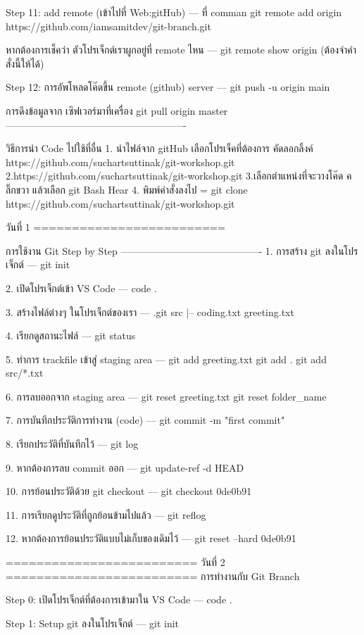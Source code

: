 {{Step 11: add remote (เข้าไปที่  Web:gitHub)
---
ที่ comman 
git remote add origin https://github.com/iamsamitdev/git-branch.git

หากต้องการเช็คว่า ตัวโปรเจ็กต์เราผูกอยู่ที่ remote ไหน
---
git remote show origin (ต้องจำคำสั่งนี้ให้ได้)

Step 12: การอัพโหลดโค๊ดขึ้น remote (github) server
---
git push -u origin main

การดึงข้อมูลจาก เซิฟเวอร์มาที่เครื่อง
git pull origin master
-------------------------------------------------------

วิธีการนำ Code ไปใช้ที่อื่น
1. นำไฟล์จาก gitHub เลือกโปรเจ็คที่ต้องการ คัดลอกลิ้งค์ https://github.com/suchartsuttinak/git-workshop.git
2.https://github.com/suchartsuttinak/git-workshop.git
3.เลือกตำแหน่งที่จะวางโค๊ด  คลิ๊กขวา แล้วเลือก git Bash Hear
4. พิมพ์คำสั่งลงไป = git clone https://github.com/suchartsuttinak/git-workshop.git


วันที่ 1
=========================

การใช้งาน Git Step by Step
-------------------------------------------
1. การสร้าง git ลงในโปรเจ็กต์
---
git init

2. เปิดโปรเจ็กต์เข้า VS Code
---
code .

3. สร้างไฟล์ต่างๆ ในโปรเจ็กต์ของเรา
---
.git
src
   |-- coding.txt
greeting.txt

4. เรียกดูสถานะไฟล์
---
git status

5. ทำการ trackfile เข้าสู่ staging area
---
git add greeting.txt
git add .
git add src/*.txt

6. การลบออกจาก staging area
---
git reset greeting.txt
git reset folder_name

7. การบันทึกประวัติการทำงาน (code)
---
git commit -m "first commit"

8. เรียกประวัติที่บันทึกไว้
---
git log

9. หากต้องการลบ commit ออก
---
git update-ref -d HEAD

10. การย้อนประวัติด้วย git checkout
---
git checkout 0de0b91

11. การเรียกดูประวัติที่ถูกย้อนข้ามไปแล้ว
---
git reflog

12. หากต้องการย้อนประวัติแบบไม่เก็บของเดิมไว้
---
git reset --hard 0de0b91

=========================
วันที่ 2
=========================
การทำงานกับ Git Branch

Step 0: เปิดโปรเจ็กต์ที่ต้องการเข้ามาใน VS Code
---
code .

Step 1: Setup git ลงในโปรเจ็กต์
---
git init

}}
